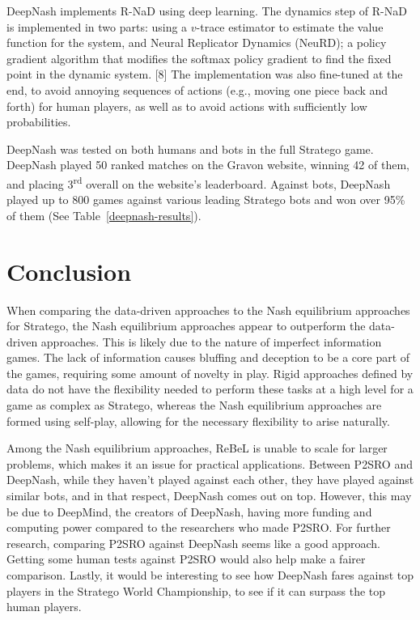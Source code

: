 \documentclass{article}
\begin{document}
DeepNash implements R-NaD using deep learning. The dynamics step of R-NaD is implemented in two parts: using a $v$-trace estimator to estimate the value function for the system, and Neural Replicator Dynamics (NeuRD); 
a policy gradient algorithm that modifies the softmax policy gradient to find the fixed point in the dynamic system. [8] 
The implementation was also fine-tuned at the end, to avoid annoying sequences of actions (e.g., moving one piece back and forth) for human players, as well as to avoid actions with sufficiently low probabilities. 

DeepNash was tested on both humans and bots in the full Stratego game. DeepNash played 50 ranked matches on the Gravon website, winning 42 of them, and placing 3\textsuperscript{rd} overall on the website's leaderboard. 
Against bots, DeepNash played up to 800 games against various leading Stratego bots and won over 95\% of them (See Table~\ref{deepnash-results}). 

\section{Conclusion}
When comparing the data-driven approaches to the Nash equilibrium approaches for Stratego, the Nash equilibrium approaches appear to outperform the data-driven approaches. 
This is likely due to the nature of imperfect information games. The lack of information causes bluffing and deception to be a core part of the games, requiring some amount of novelty in play. 
Rigid approaches defined by data do not have the flexibility needed to perform these tasks at a high level for a game as complex as Stratego, 
whereas the Nash equilibrium approaches are formed using self-play, allowing for the necessary flexibility to arise naturally. 

Among the Nash equilibrium approaches, ReBeL is unable to scale for larger problems, which makes it an issue for practical applications.  
Between P2SRO and DeepNash, while they haven’t played against each other, they have played against similar bots, and in that respect, DeepNash comes out on top. 
However, this may be due to DeepMind, the creators of DeepNash, having more funding and computing power compared to the researchers who made P2SRO. 
For further research, comparing P2SRO against DeepNash seems like a good approach. Getting some human tests against P2SRO would also help make a fairer comparison. 
Lastly, it would be interesting to see how DeepNash fares against top players in the Stratego World Championship, to see if it can surpass the top human players. 
\end{document}
